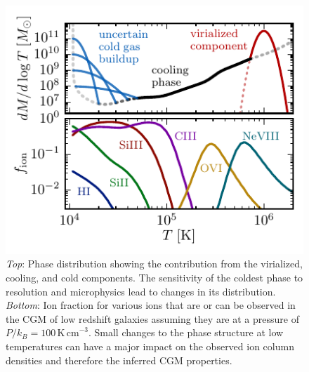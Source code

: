 \documentclass[11pt,letterpaper,english]{article}
\begin{document}
\begin{figure}[t]
    \centering
    \begin{minipage}{0.6\textwidth}
        \includegraphics[width=\textwidth]{../figures/dMdlogT_picture_ion_all_P100_broad_narrow_3in.pdf} 
    \end{minipage}\hfill
    \begin{minipage}{0.4\textwidth}
        \centering
\caption{\textit{Top}: Phase distribution showing the contribution from the virialized, cooling, and cold components. The sensitivity of the coldest phase to resolution and microphysics lead to changes in its distribution. \textit{Bottom}: Ion fraction for various ions that are or can be observed in the CGM of low redshift galaxies assuming they are at a pressure of $P/k_B = 100\,\mathrm{K\,cm}^{-3}$. Small changes to the phase structure at low temperatures can have a major impact on the observed ion column densities and therefore the inferred CGM properties.\label{fig:multiphase}} 
\end{minipage}
\end{figure}


\end{document}
